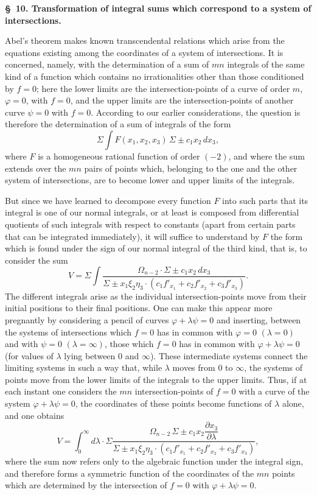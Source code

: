 \documentclass[10pt]{article}
\begin{document}
\begin{center}
{\bfseries \S\ 10. Transformation of integral sums which correspond to a system of intersections.}
\end{center}

Abel's theorem makes known transcendental relations which arise from the equations existing among the coordinates of a system of intersections. It is concerned, namely, with the determination of a sum of $mn$ integrals of the same kind of a function which contains no irrationalities other than those conditioned by $f=0$; here the lower limits are the intersection-points of a curve of order $m$, $\varphi=0$, with $f=0$, and the upper limits are the intersection-points of another curve $\psi=0$ with $f=0$. According to our earlier considerations, the question is therefore the determination of a sum of integrals of the form
\[
\Sigma\int F(x_1,x_2,x_3)\,\Sigma\pm c_1x_2\,dx_3,
\]
where $F$ is a homogeneous rational function of order $(-2)$, and where the sum extends over the $mn$ pairs of points which, belonging to the one and the other system of intersections, are to become lower and upper limits of the integrals.

But since we have learned to decompose every function $F$ into such parts that its integral is one of our normal integrals, or at least is composed from differential quotients of such integrals with respect to constants (apart from certain parts that can be integrated immediately), it will suffice to understand by $F$ the form which is found under the sign of our normal integral of the third kind, that is, to consider the sum
\[
V=\Sigma\int
\frac{\Omega_{n-2}\cdot \Sigma\pm c_1x_2\,dx_3}
{\Sigma\pm x_1\xi_2\eta_3\cdot(c_1 f'_{x_1}+c_2 f'_{x_2}+c_3 f'_{x_3})}.
\]
The different integrals arise as the individual intersection-points move from their initial positions to their final positions. One can make this appear more pregnantly by considering a pencil of curves $\varphi+\lambda\psi=0$ and inserting, between the systems of intersections which $f=0$ has in common with $\varphi=0$ $(\lambda=0)$ and with $\psi=0$ $(\lambda=\infty)$, those which $f=0$ has in common with $\varphi+\lambda\psi=0$ (for values of $\lambda$ lying between $0$ and $\infty$). These intermediate systems connect the limiting systems in such a way that, while $\lambda$ moves from $0$ to $\infty$, the systems of points move from the lower limits of the integrals to the upper limits. Thus, if at each instant one considers the $mn$ intersection-points of $f=0$ with a curve of the system $\varphi+\lambda\psi=0$, the coordinates of these points become functions of $\lambda$ alone, and one obtains
\[
V=\int_0^\infty d\lambda\cdot \Sigma
\frac{\Omega_{n-2}\,\Sigma\pm c_1x_2\dfrac{\partial x_3}{\partial\lambda}}
{\Sigma\pm x_1\xi_2\eta_3\cdot(c_1 f'_{x_1}+c_2 f'_{x_2}+c_3 f'_{x_3})},
\]
where the sum now refers only to the algebraic function under the integral sign, and therefore forms a symmetric function of the coordinates of the $mn$ points which are determined by the intersection of $f=0$ with $\varphi+\lambda\psi=0$.
\end{document}

